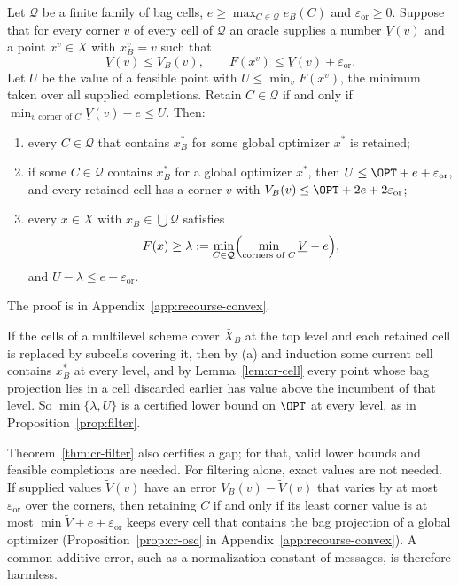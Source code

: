\begin{theorem}\label{thm:cr-filter}
Let $\mathcal Q$ be a finite family of bag cells,
$e\ge\max_{C\in\mathcal Q}e_B(C)$ and $\varepsilon_{\mathrm{or}}\ge0$. Suppose that for every
corner $v$ of every cell of $\mathcal Q$ an oracle supplies a number
$\underline V(v)$ and a point $x^v\in X$ with $x^v_B=v$ such that
\begin{equation}\label{eq:cr-oracle}
\underline V(v)\le V_B(v),\qquad F(x^v)\le\underline V(v)+\varepsilon_{\mathrm{or}} .
\end{equation}
Let $U$ be the value of a feasible point with $U\le\min_vF(x^v)$, the
minimum taken over all supplied completions. Retain $C\in\mathcal Q$ if and
only if $\min_{v\text{ corner of }C}\underline V(v)-e\le U$. Then:
\begin{enumerate}
\item[(a)] every $C\in\mathcal Q$ that contains $x^*_B$ for some global
optimizer $x^*$ is retained;
\item[(b)] if some $C\in\mathcal Q$ contains $x^*_B$ for a global optimizer
$x^*$, then $U\le\OPT+e+\varepsilon_{\mathrm{or}}$, and every retained cell has a corner $v$
with $V_B(v)\le\OPT+2e+2\varepsilon_{\mathrm{or}}$;
\item[(c)] every $x\in X$ with $x_B\in\bigcup\mathcal Q$ satisfies
\[
F(x)\ge\lambda:=\min_{C\in\mathcal Q}\Bigl(\min_{\text{corners of }C}\underline V-e\Bigr),
\]
and $U-\lambda\le e+\varepsilon_{\mathrm{or}}$.
\end{enumerate}
\end{theorem}
The proof is in Appendix~\ref{app:recourse-convex}.

If the cells of a multilevel scheme cover $\bar X_B$ at the top level and
each retained cell is replaced by subcells covering it, then by (a) and
induction some current cell contains $x^*_B$ at every level, and by
Lemma~\ref{lem:cr-cell} every point whose bag projection lies in a cell
discarded earlier has value above the incumbent of that level. So
$\min\{\lambda,U\}$ is a certified lower bound on $\OPT$ at every level, as
in Proposition~\ref{prop:filter}.

Theorem~\ref{thm:cr-filter} also certifies a gap; for that, valid lower
bounds and feasible completions are needed. For filtering alone, exact
values are not needed. If supplied values $\tilde V(v)$ have an error
$V_B(v)-\tilde V(v)$ that varies by at most $\varepsilon_{\mathrm{or}}$ over the corners, then
retaining $C$ if and only if its least corner value is at most
$\min\tilde V+e+\varepsilon_{\mathrm{or}}$ keeps every cell that contains the bag projection of a
global optimizer (Proposition~\ref{prop:cr-osc} in
Appendix~\ref{app:recourse-convex}). A common additive error, such as a
normalization constant of messages, is therefore harmless.

